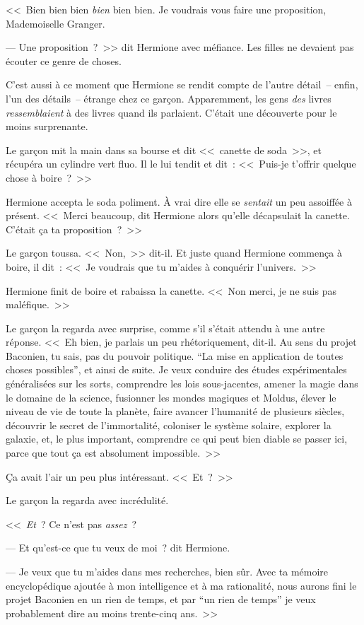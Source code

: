 <<~Bien bien bien \emph{bien} bien bien. Je voudrais vous faire une proposition, Mademoiselle Granger.

--- Une proposition~?~>> dit Hermione avec méfiance. Les filles ne devaient pas écouter ce genre de choses.

C'est aussi à ce moment que Hermione se rendit compte de l'autre détail~-- enfin, l'un des détails~-- étrange chez ce garçon. Apparemment, les gens \emph{des} livres \emph{ressemblaient} à des livres quand ils parlaient. C'était une découverte pour le moins surprenante.

Le garçon mit la main dans sa bourse et dit <<~canette de soda~>>, et récupéra un cylindre vert fluo. Il le lui tendit et dit~: <<~Puis-je t'offrir quelque chose à boire~?~>>

Hermione accepta le soda poliment. À vrai dire elle se \emph{sentait} un peu assoiffée à présent. <<~Merci beaucoup, dit Hermione alors qu'elle décapsulait la canette. C'était ça ta proposition~?~>>

Le garçon toussa. <<~Non,~>> dit-il. Et juste quand Hermione commença à boire, il dit~: <<~Je voudrais que tu m'aides à conquérir l'univers.~>>

Hermione finit de boire et rabaissa la canette. <<~Non merci, je ne suis pas maléfique.~>>

Le garçon la regarda avec surprise, comme s'il s'était attendu à une autre réponse. <<~Eh bien, je parlais un peu rhétoriquement, dit-il. Au sens du projet Baconien, tu sais, pas du pouvoir politique. “La mise en application de toutes choses possibles”, et ainsi de suite. Je veux conduire des études expérimentales généralisées sur les sorts, comprendre les lois sous-jacentes, amener la magie dans le domaine de la science, fusionner les mondes magiques et Moldus, élever le niveau de vie de toute la planète, faire avancer l'humanité de plusieurs siècles, découvrir le secret de l'immortalité, coloniser le système solaire, explorer la galaxie, et, le plus important, comprendre ce qui peut bien diable se passer ici, parce que tout ça est absolument impossible.~>>

Ça avait l'air un peu plus intéressant. <<~Et~?~>>

Le garçon la regarda avec incrédulité.

<<~\emph{Et}~? Ce n'est pas \emph{assez}~?

--- Et qu'est-ce que tu veux de moi~? dit Hermione.

--- Je veux que tu m'aides dans mes recherches, bien sûr. Avec ta mémoire encyclopédique ajoutée à mon intelligence et à ma rationalité, nous aurons fini le projet Baconien en un rien de temps, et par “un rien de temps” je veux probablement dire au moins trente-cinq ans.~>>

